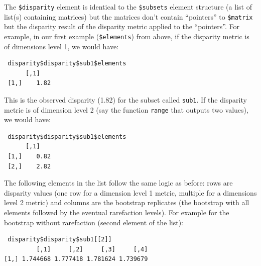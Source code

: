 \documentclass[]{book}
\begin{document}
The \texttt{\$disparity} element is identical to the \texttt{\$subsets} element structure (a list of list(s) containing matrices) but the matrices don't contain ``pointers'' to \texttt{\$matrix} but the disparity result of the disparity metric applied to the ``pointers''.
For example, in our first example (\texttt{\$elements}) from above, if the disparity metric is of dimensions level 1, we would have:

\begin{verbatim}
 disparity$disparity$sub1$elements
      [,1]
 [1,]    1.82
\end{verbatim}

This is the observed disparity (1.82) for the subset called \texttt{sub1}.
If the disparity metric is of dimension level 2 (say the function \texttt{range} that outputs two values), we would have:

\begin{verbatim}
 disparity$disparity$sub1$elements
      [,1]
 [1,]    0.82
 [2,]    2.82
\end{verbatim}

The following elements in the list follow the same logic as before: rows are disparity values (one row for a dimension level 1 metric, multiple for a dimensions level 2 metric) and columns are the bootstrap replicates (the bootstrap with all elements followed by the eventual rarefaction levels).
For example for the bootstrap without rarefaction (second element of the list):

\begin{verbatim}
 disparity$disparity$sub1[[2]]
         [,1]     [,2]     [,3]     [,4]
[1,] 1.744668 1.777418 1.781624 1.739679 
\end{verbatim}


\end{document}

